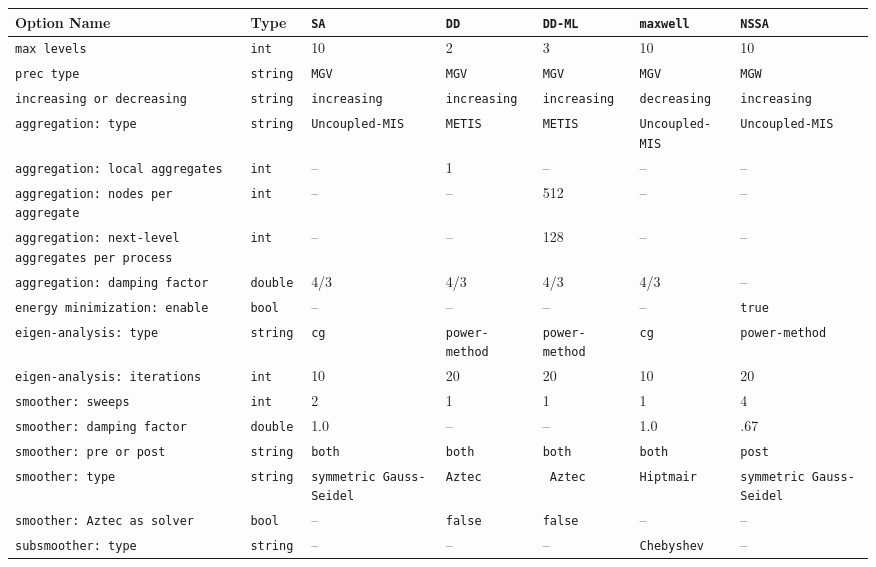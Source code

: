 \documentclass{article}[11pt]
\begin{document}
\begin{table}
  \begin{tabular}{| p{6.5cm} | p{1.3cm} | p{2.5cm} | p{2.1cm} | p{2.1cm} | p{2.5cm} | p{2.2cm} |}
    \hline
    Option Name & Type &{\tt SA}&{\tt DD}&{\tt DD-ML}&{\tt maxwell}&{\tt NSSA} \\
    \hline
    \hline
{\tt max levels} & \tt int & 10 & 2 & 3 & 10 & 10 \\
{\tt prec type} & \tt string & \tt MGV  & \tt MGV & \tt MGV & \tt MGV & \tt MGW \\
\tt increasing or decreasing & \tt string & \tt increasing & \tt increasing & \tt increasing 
& \tt decreasing & \tt increasing \\
\hline
\hline
\tt aggregation: type & \tt string & \tt Uncoupled-MIS & \tt METIS & \tt METIS & \tt Uncoupled-MIS & 
\tt Uncoupled-MIS \\
\tt aggregation: local aggregates & \tt int & -- & 1 & -- & -- & -- \\
\tt aggregation: nodes per aggregate & \tt int & -- & -- & 512 & -- & -- \\
\tt aggregation: next-level aggregates \phantom{aggregation: }per process & \tt int & -- & -- &128 & -- & -- \\
\tt aggregation: damping factor & \tt double &  4/3 & 4/3 & 4/3 & 4/3 & -- \\
\tt energy minimization: enable & \tt bool & -- & -- & -- & -- & \tt true \\
\tt eigen-analysis: type & \tt string & \tt cg & \tt power-method & \tt power-method &
                          \tt cg & \tt power-method \\
\tt eigen-analysis: iterations & \tt int & 10  & 20 & 20 & 10 & 20 \\
\hline
\hline
\tt smoother: sweeps         & \tt int    &    2   &    1   &   1    &    1    & 4   \\
\tt smoother: damping factor & \tt double &   1.0  &    --  &   --   &    1.0  & .67 \\
\tt smoother: pre or post    & \tt string &\tt both&\tt both&\tt both&\tt both & \tt post \\
\tt smoother: type & \tt string & \tt symmetric Gauss-Seidel & \tt Aztec & \tt
Aztec & \tt Hiptmair & \tt symmetric Gauss-Seidel \\
\tt smoother: Aztec as solver & \tt bool & -- & \tt false & \tt false & -- & -- \\
\tt subsmoother: type     & \tt string & -- & -- & -- & \tt Chebyshev & -- \\

\end{tabular}
\end{table}
\end{document}
